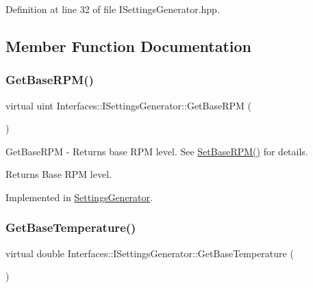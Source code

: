 Definition at line 32 of file I\+Settings\+Generator.\+hpp.



\subsection{Member Function Documentation}
\mbox{\label{class_interfaces_1_1_i_settings_generator_ad088253da57b2ee0b94fe6fd1fb2dfdd}} 
\subsubsection{\texorpdfstring{Get\+Base\+R\+P\+M()}{GetBaseRPM()}}
{\footnotesize\ttfamily virtual uint Interfaces\+::\+I\+Settings\+Generator\+::\+Get\+Base\+R\+PM (\begin{DoxyParamCaption}{ }\end{DoxyParamCaption})\hspace{0.3cm}{\ttfamily [pure virtual]}}



Get\+Base\+R\+PM -\/ Returns base R\+PM level. See \hyperlink{class_interfaces_1_1_i_settings_generator_a4caf07447d0930440d9f21318892244c}{Set\+Base\+R\+P\+M()} for details. 

\begin{DoxyReturn}{Returns}
Base R\+PM level. 
\end{DoxyReturn}


Implemented in \hyperlink{class_settings_generator_a99bbe6e67e638ccc7bf6b21b3bc36135}{Settings\+Generator}.

\mbox{\label{class_interfaces_1_1_i_settings_generator_a9cc36185b446f21e09a0e5633f39a1c5}} 
\subsubsection{\texorpdfstring{Get\+Base\+Temperature()}{GetBaseTemperature()}}
{\footnotesize\ttfamily virtual double Interfaces\+::\+I\+Settings\+Generator\+::\+Get\+Base\+Temperature (\begin{DoxyParamCaption}{ }\end{DoxyParamCaption})\hspace{0.3cm}{\ttfamily [pure virtual]}}



